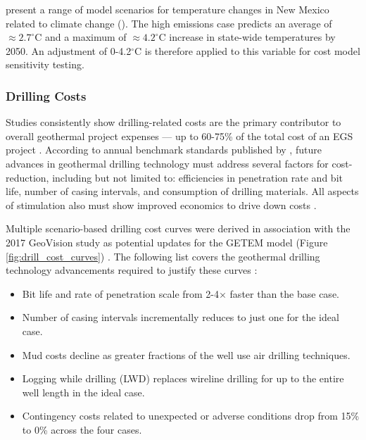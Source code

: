 \citeauthor{frankson_new_2019} present a range of model scenarios for temperature changes in New Mexico related to climate change (\citeyear[Figure 1]{frankson_new_2019}). The high emissions case predicts an average of $\approx 2.7^\circ$C and a maximum of $\approx 4.2^\circ$C increase in state-wide temperatures by 2050. An adjustment of 0-4.2$^\circ$C is therefore applied to this variable for cost model sensitivity testing.

\subsubsection{Drilling Costs}\label{ch4:drilling_uncertainty}
Studies consistently show drilling-related costs are the primary contributor to overall geothermal project expenses --- up to 60-75\% of the total cost of an EGS project \citep{lukawski_uncertainty_2016}. According to annual benchmark standards published by \citet{nrel_2020_2020}, future advances in geothermal drilling technology must address several factors for cost-reduction, including but not limited to: efficiencies in penetration rate and bit life, number of casing intervals, and consumption of drilling materials. All aspects of stimulation also must show improved economics to drive down costs \citep{nrel_2020_2020}.

Multiple scenario-based drilling cost curves were derived in association with the 2017 GeoVision study as potential updates for the GETEM model (Figure \ref{fig:drill_cost_curves}) \citep{lowry_implications_2017}. The following list covers the geothermal drilling technology advancements required to justify these curves \citep{augustine_geovision_2019}:
\begin{itemize}[itemsep=2pt]
    \item Bit life and rate of penetration scale from 2-4$\times$ faster than the base case.
    \item Number of casing intervals incrementally reduces to just one for the ideal case.
    \item Mud costs decline as greater fractions of the well use air drilling techniques.
    \item Logging while drilling (LWD) replaces wireline drilling for up to the entire well length in the ideal case.
    \item Contingency costs related to unexpected or adverse conditions drop from 15\% to 0\% across the four cases.
\end{itemize}

